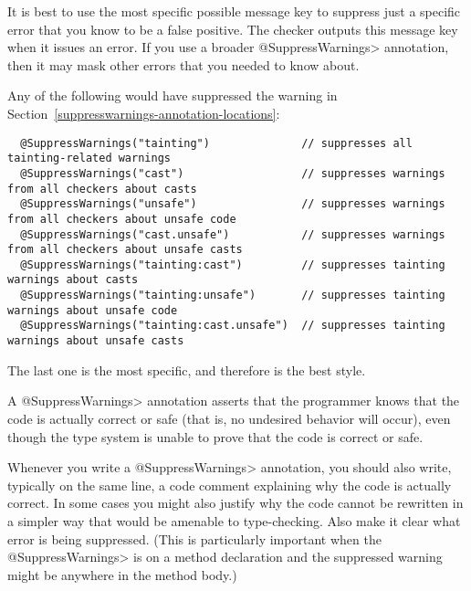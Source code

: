 

\label{compiler-message-keys}

It is best to use the most specific possible message key to suppress just a
specific error that you know to be a false positive.  The checker outputs
this message key when it issues an error.  If you use a broader
\<@SuppressWarnings> annotation, then it may mask other errors that you
needed to know about.

Any of the following would have suppressed the warning in
Section~\ref{suppresswarnings-annotation-locations}:

\begin{Verbatim}
  @SuppressWarnings("tainting")              // suppresses all tainting-related warnings
  @SuppressWarnings("cast")                  // suppresses warnings from all checkers about casts
  @SuppressWarnings("unsafe")                // suppresses warnings from all checkers about unsafe code
  @SuppressWarnings("cast.unsafe")           // suppresses warnings from all checkers about unsafe casts
  @SuppressWarnings("tainting:cast")         // suppresses tainting warnings about casts
  @SuppressWarnings("tainting:unsafe")       // suppresses tainting warnings about unsafe code
  @SuppressWarnings("tainting:cast.unsafe")  // suppresses tainting warnings about unsafe casts
\end{Verbatim}

The last one is the most specific, and therefore is the best style.



A \<@SuppressWarnings> annotation asserts that the programmer knows that
the code is actually correct or safe (that is, no undesired behavior will
occur), even though the type system is unable to prove that the code is
correct or safe.

Whenever you write a \<@SuppressWarnings> annotation, you should also
write, typically on the same line, a code comment
explaining why the code is actually correct.  In some cases you might also
justify why the code cannot be rewritten in a simpler way that would be
amenable to type-checking.  Also make it clear what error is being
suppressed.  (This is particularly important when the \<@SuppressWarnings> is
on a method declaration and the suppressed warning might be anywhere in the
method body.)

